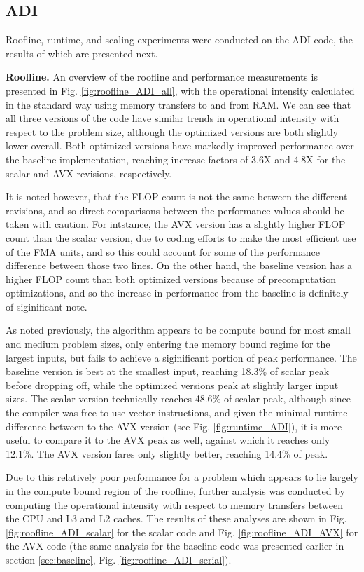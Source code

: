 \documentclass[letterpaper]{article}
\newcommand{\mypar}[1]{{\bf #1.}}
\begin{document}
\subsection{ADI}\label{subsec:ADI_results}
Roofline, runtime, and scaling experiments were conducted on the ADI code, the results of which are presented next.

\mypar{Roofline}
An overview of the roofline and performance measurements is presented in Fig. \ref{fig:roofline_ADI_all}, with the operational intensity calculated in the standard way using memory transfers to and from RAM. We can see that all three versions of the code have similar trends in operational intensity with respect to the problem size, although the optimized versions are both slightly lower overall. Both optimized versions have markedly improved performance over the baseline implementation, reaching increase factors of 3.6X and 4.8X for the scalar and AVX revisions, respectively.

It is noted however, that the FLOP count is not the same between the different revisions, and so direct comparisons between the performance values should be taken with caution. For intstance, the AVX version has a slightly higher FLOP count than the scalar version, due to coding efforts to make the most efficient use of the FMA units, and so this could account for some of the performance difference between those two lines. On the other hand, the baseline version has a higher FLOP count than both optimized versions because of precomputation optimizations, and so the increase in performance from the baseline is definitely of siginificant note.

As noted previously, the algorithm appears to be compute bound for most small and medium problem sizes, only entering the memory bound regime for the largest inputs, but fails to achieve a siginificant portion of peak performance. The baseline version is best at the smallest input, reaching 18.3\% of scalar peak before dropping off, while the optimized versions peak at slightly larger input sizes. The scalar version technically reaches 48.6\% of scalar peak, although since the compiler was free to use vector instructions, and given the minimal runtime difference between to the AVX version (see Fig. \ref{fig:runtime_ADI}), it is more useful to compare it to the AVX peak as well, against which it reaches only 12.1\%. The AVX version fares only slightly better, reaching 14.4\% of peak.

Due to this relatively poor performance for a problem which appears to lie largely in the compute bound region of the roofline, further analysis was conducted by computing the operational intensity with respect to memory transfers between the CPU and L3 and L2 caches. The results of these analyses are shown in Fig. \ref{fig:roofline_ADI_scalar} for the scalar code and Fig. \ref{fig:roofline_ADI_AVX} for the AVX code (the same analysis for the baseline code was presented earlier in section \ref{sec:baseline}, Fig. \ref{fig:roofline_ADI_serial}).
\end{document}
